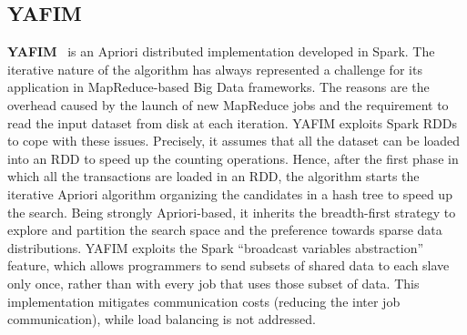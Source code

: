 

\subsection{YAFIM}
{\bf YAFIM}~\cite{YAFIM} is an Apriori distributed implementation developed in Spark.
The iterative nature of the algorithm has always represented a challenge for its application in MapReduce-based Big Data
frameworks. The reasons are the overhead caused by the launch of new MapReduce
jobs and the requirement to read the input dataset from disk at each
iteration. YAFIM exploits Spark RDDs to cope with these issues. Precisely, it
assumes that all the dataset can be loaded into an RDD to speed up the
counting operations. Hence, after the first phase in which all the transactions
are loaded in an RDD, the algorithm starts the iterative Apriori algorithm organizing
the candidates in a hash tree to speed up the search.
Being strongly Apriori-based, it inherits the breadth-first strategy to explore and partition
the search space and the preference towards sparse data distributions.
YAFIM exploits the Spark ``broadcast variables abstraction'' feature, which allows
programmers to send subsets of shared data to each slave only once,
rather than with every job that uses those subset of data. This
implementation mitigates communication costs (reducing the inter job
communication), while load balancing is not addressed.


